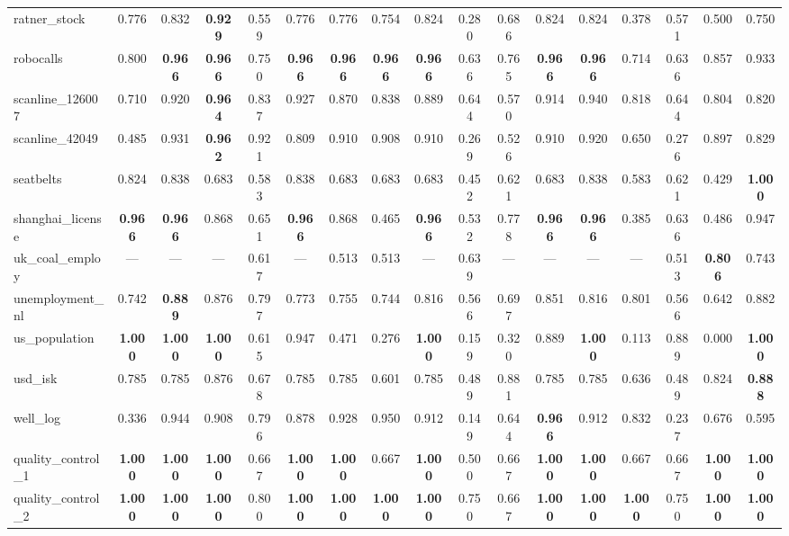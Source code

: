 \documentclass[11pt,a4paper]{article}
\begin{document}
\begin{table}
{\begin{tabular}{lcccccccccccccccc}
ratner\_stock & 0.776 & 0.832 & \textbf{0.929} & 0.559 & 0.776 & 0.776 & 0.754 & 0.824 & 0.280 & 0.686 & 0.824 & 0.824 & 0.378 & 0.571 & 0.500 & 0.750 \\
robocalls & 0.800 & \textbf{0.966} & \textbf{0.966} & 0.750 & \textbf{0.966} & \textbf{0.966} & \textbf{0.966} & \textbf{0.966} & 0.636 & 0.765 & \textbf{0.966} & \textbf{0.966} & 0.714 & 0.636 & 0.857 & 0.933 \\
scanline\_126007 & 0.710 & 0.920 & \textbf{0.964} & 0.837 & 0.927 & 0.870 & 0.838 & 0.889 & 0.644 & 0.570 & 0.914 & 0.940 & 0.818 & 0.644 & 0.804 & 0.820 \\
scanline\_42049 & 0.485 & 0.931 & \textbf{0.962} & 0.921 & 0.809 & 0.910 & 0.908 & 0.910 & 0.269 & 0.526 & 0.910 & 0.920 & 0.650 & 0.276 & 0.897 & 0.829 \\
seatbelts & 0.824 & 0.838 & 0.683 & 0.583 & 0.838 & 0.683 & 0.683 & 0.683 & 0.452 & 0.621 & 0.683 & 0.838 & 0.583 & 0.621 & 0.429 & \textbf{1.000} \\
shanghai\_license & \textbf{0.966} & \textbf{0.966} & 0.868 & 0.651 & \textbf{0.966} & 0.868 & 0.465 & \textbf{0.966} & 0.532 & 0.778 & \textbf{0.966} & \textbf{0.966} & 0.385 & 0.636 & 0.486 & 0.947 \\
uk\_coal\_employ & — & — & — & 0.617 & — & 0.513 & 0.513 & — & 0.639 & — & — & — & — & 0.513 & \textbf{0.806} & 0.743 \\
unemployment\_nl & 0.742 & \textbf{0.889} & 0.876 & 0.797 & 0.773 & 0.755 & 0.744 & 0.816 & 0.566 & 0.697 & 0.851 & 0.816 & 0.801 & 0.566 & 0.642 & 0.882 \\
us\_population & \textbf{1.000} & \textbf{1.000} & \textbf{1.000} & 0.615 & 0.947 & 0.471 & 0.276 & \textbf{1.000} & 0.159 & 0.320 & 0.889 & \textbf{1.000} & 0.113 & 0.889 & 0.000 & \textbf{1.000} \\
usd\_isk & 0.785 & 0.785 & 0.876 & 0.678 & 0.785 & 0.785 & 0.601 & 0.785 & 0.489 & 0.881 & 0.785 & 0.785 & 0.636 & 0.489 & 0.824 & \textbf{0.888} \\
well\_log & 0.336 & 0.944 & 0.908 & 0.796 & 0.878 & 0.928 & 0.950 & 0.912 & 0.149 & 0.644 & \textbf{0.966} & 0.912 & 0.832 & 0.237 & 0.676 & 0.595 \\
quality\_control\_1 & \textbf{1.000} & \textbf{1.000} & \textbf{1.000} & 0.667 & \textbf{1.000} & \textbf{1.000} & 0.667 & \textbf{1.000} & 0.500 & 0.667 & \textbf{1.000} & \textbf{1.000} & 0.667 & 0.667 & \textbf{1.000} & \textbf{1.000} \\
quality\_control\_2 & \textbf{1.000} & \textbf{1.000} & \textbf{1.000} & 0.800 & \textbf{1.000} & \textbf{1.000} & \textbf{1.000} & \textbf{1.000} & 0.750 & 0.667 & \textbf{1.000} & \textbf{1.000} & \textbf{1.000} & 0.750 & \textbf{1.000} & \textbf{1.000} \\

\end{tabular}}
\end{table}
\end{document}
